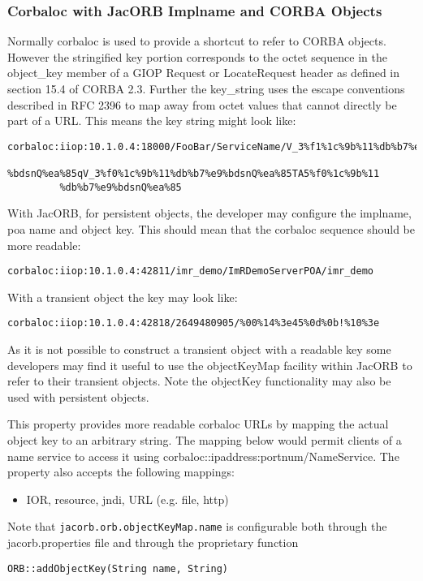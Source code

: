 \subsubsection{Corbaloc with JacORB Implname and CORBA Objects}

Normally corbaloc is used to provide a shortcut to refer to CORBA objects. However the stringified key portion corresponds to the octet sequence in the object\_key member of a GIOP Request or LocateRequest header as defined in section 15.4 of CORBA 2.3. Further the key\_string uses the escape conventions described in RFC 2396 to map away from octet values that cannot directly be part of a URL. This means the key string might look like:
\small{
\begin{verbatim}
corbaloc:iiop:10.1.0.4:18000/FooBar/ServiceName/V_3%f1%1c%9b%11%db%b7%e9
         %bdsnQ%ea%85qV_3%f0%1c%9b%11%db%b7%e9%bdsnQ%ea%85TA5%f0%1c%9b%11
         %db%b7%e9%bdsnQ%ea%85
\end{verbatim}
}
With JacORB, for persistent objects, the developer may configure the implname, poa name and object key. This should mean that the corbaloc sequence should be more readable:
\small{
\begin{verbatim}
corbaloc:iiop:10.1.0.4:42811/imr_demo/ImRDemoServerPOA/imr_demo
\end{verbatim}
}
With a transient object the key may look like:
\small{
\begin{verbatim}
corbaloc:iiop:10.1.0.4:42818/2649480905/%00%14%3e45%0d%0b!%10%3e
\end{verbatim}
}
As it is not possible to construct a transient object with a readable key some developers may find it useful to use the objectKeyMap facility within JacORB to refer to their transient objects. Note the objectKey functionality may also be used with persistent objects.

This property provides more readable corbaloc URLs by mapping the actual object key to an arbitrary string. The mapping below would permit clients of a name service to access it using corbaloc::ipaddress:portnum/NameService. The property also accepts the following mappings:
\begin{itemize}
\item IOR, resource, jndi, URL (e.g. file, http)
\end{itemize}
Note that {\tt jacorb.orb.objectKeyMap.name} is configurable both through the jacorb.properties file and through the proprietary function

{\tt ORB::addObjectKey(String name, String)}


